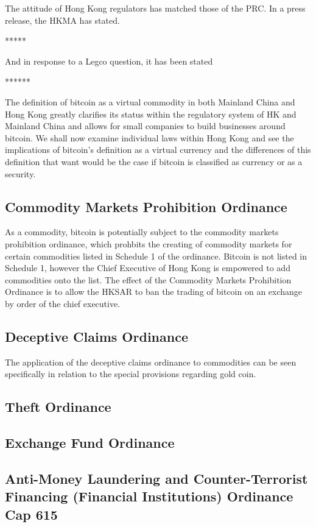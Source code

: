 The attitude of Hong Kong regulators has matched those of the PRC.  In
a press release, the HKMA has stated.

*****

And in response to a Legco question, it has been stated

******

The definition of bitcoin as a virtual commodity in both Mainland
China and Hong Kong greatly clarifies its status within the regulatory
system of HK and Mainland China and allows for small companies to
build businesses around bitcoin.  We shall now examine individual laws
within Hong Kong and see the implications of bitcoin's definition as a
virtual currency and the differences of this definition that want
would be the case if bitcoin is classified as currency or as a security.

\subsection{Commodity Markets Prohibition Ordinance}
As a commodity, bitcoin is potentially subject to the commodity
markets prohibition ordinance, which prohbits the creating of
commodity markets for certain commodities listed in Schedule 1 of the
ordinance.  Bitcoin is not listed in Schedule 1, however the Chief
Executive of Hong Kong is empowered to add commodities onto the list.
The effect of the Commodity Markets Prohibition Ordinance is to allow
the HKSAR to ban the trading of bitcoin on an exchange by order of the
chief executive.

\subsection{Deceptive Claims Ordinance}

The application of the deceptive claims ordinance to commodities can
be seen specifically in relation to the special provisions regarding
gold coin.

\subsection{Theft Ordinance}



\subsection{Exchange Fund Ordinance}

\subsection{Anti-Money Laundering and Counter-Terrorist Financing
(Financial Institutions) Ordinance Cap 615}

